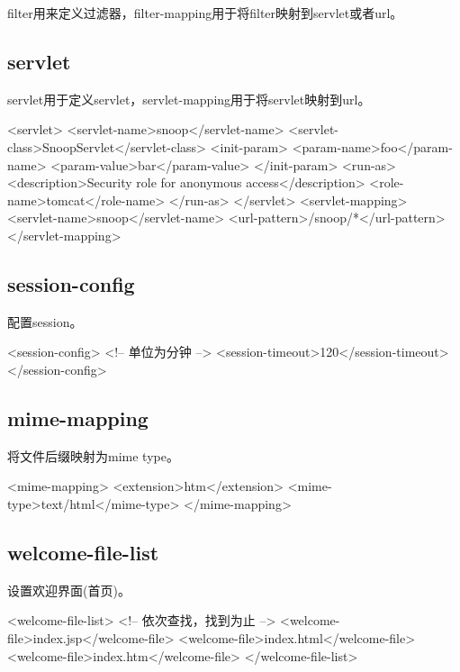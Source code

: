 \documentclass[a4paper,11pt]{article}
\begin{document}
filter用来定义过滤器，filter-mapping用于将filter映射到servlet或者url。

\subsection[servlet]{servlet}
servlet用于定义servlet，servlet-mapping用于将servlet映射到url。

\begin{xmlcode}
<servlet>
    <servlet-name>snoop</servlet-name>
    <servlet-class>SnoopServlet</servlet-class>
    <init-param>
        <param-name>foo</param-name>
        <param-value>bar</param-value>
    </init-param>
    <run-as>
        <description>Security role for anonymous access</description>
        <role-name>tomcat</role-name>
    </run-as>
</servlet>
<servlet-mapping>
    <servlet-name>snoop</servlet-name>
    <url-pattern>/snoop/*</url-pattern>
</servlet-mapping>
\end{xmlcode}

\subsection[session-config]{session-config}
配置session。

\begin{xmlcode}
<session-config>
    <!-- 单位为分钟 -->
    <session-timeout>120</session-timeout>
</session-config>
\end{xmlcode}

\subsection[mime-mapping]{mime-mapping}
将文件后缀映射为mime type。

\begin{xmlcode}
<mime-mapping>
    <extension>htm</extension>
    <mime-type>text/html</mime-type>
</mime-mapping>
\end{xmlcode}

\subsection[welcome-file-list]{welcome-file-list}
设置欢迎界面(首页)。

\begin{xmlcode}
<welcome-file-list>
    <!-- 依次查找，找到为止 -->
    <welcome-file>index.jsp</welcome-file>
    <welcome-file>index.html</welcome-file>
    <welcome-file>index.htm</welcome-file>
</welcome-file-list>
\end{xmlcode}
\end{document}
